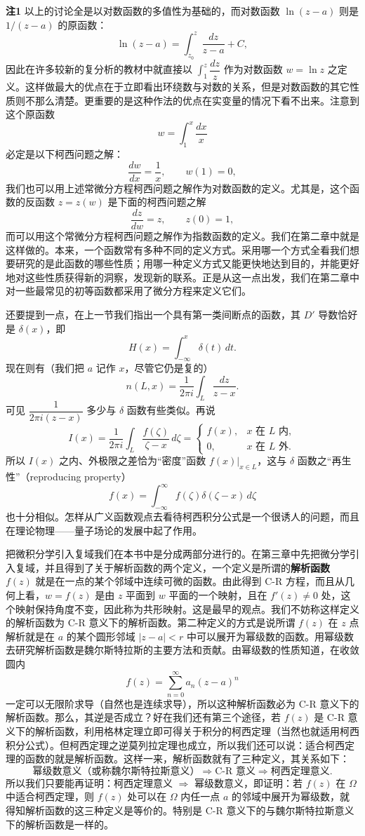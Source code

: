 \noindent\textbf{注1}
以上的讨论全是以对数函数的多值性为基础的，而对数函数 $\ln(z-a)$ 则是 $1/(z-a)$ 的原函数：
\[
 \ln(z-a)=\int_{z_0}^z\frac{dz}{z-a}+C,
\]
因此在许多较新的复分析的教材中就直接以 $\int_1^z\dfrac{dz}{z}$ 作为对数函数 $w=\ln z$ 之定义。这样做最大的优点在于立即看出环绕数与对数的关系，但是对数函数的其它性质则不那么清楚。更重要的是这种作法的优点在实变量的情况下看不出来。注意到这个原函数
\[
 w=\int_1^x\frac{dx}{x}
\]
必定是以下柯西问题之解：
\[
 \frac{dw}{dx}=\frac1x,\qquad w(1)=0,
\]
我们也可以用上述常微分方程柯西问题之解作为对数函数的定义。尤其是，这个函数的反函数 $z=z(w)$ 是下面的柯西问题之解
\[
 \frac{dz}{dw}=z,\qquad z(0)=1,
\]
而可以用这个常微分方程柯西问题之解作为指数函数的定义。我们在第二章中就是这样做的。本来，一个函数常有多种不同的定义方式。采用哪一个方式全看我们想要研究的是此函数的哪些性质；用哪一种定义方式又能更快地达到目的，并能更好地对这些性质获得新的洞察，发现新的联系。正是从这一点出发，我们在第二章中对一些最常见的初等函数都采用了微分方程来定义它们。

还要提到一点，在上一节我们指出一个具有第一类间断点的函数，其 $D'$ 导数恰好是 $\delta(x)$，即
\[
 H(x)=\int_{-\infty}^x\delta(t)\,dt.
\]
现在则有（我们把 $a$ 记作 $x$，尽管它仍是复的）
\[
 n(L,x)=\frac1{2\pi i}\int_L\frac{dz}{z-x}.
\]
可见 $\dfrac1{2\pi i(z-x)}$ 多少与 $\delta$ 函数有些类似。再说
\[
 I(x)=\frac1{2\pi i}\int_L\frac{f(\zeta)}{\zeta-x}\,d\zeta
 =\begin{cases}
 f(x),&x\text{ 在 }L\text{ 内},\\
 0,&x\text{ 在 }L\text{ 外}.
 \end{cases}
\]
所以 $I(x)$ 之内、外极限之差恰为“密度”函数 $f(x)|_{x\in L}$，这与 $\delta$ 函数之“再生性”（reproducing property）
\[
 f(x)=\int_{-\infty}^{\infty}f(\zeta)\delta(\zeta-x)\,d\zeta
\]
也十分相似。怎样从广义函数观点去看待柯西积分公式是一个很诱人的问题，而且在理论物理——量子场论的发展中起了作用。

把微积分学引入复域我们在本书中是分成两部分进行的。在第三章中先把微分学引入复域，并且得到了关于解析函数的两个定义，一个定义是所谓的\textbf{解析函数 $f(z)$} 就是在一点的某个邻域中连续可微的函数。由此得到 C-R 方程，而且从几何上看，$w=f(z)$ 是由 $z$ 平面到 $w$ 平面的一个映射，且在 $f'(z)\ne0$ 处，这个映射保持角度不变，因此称为共形映射。这是最早的观点。我们不妨称这样定义的解析函数为 C-R 意义下的解析函数。第二种定义的方式是说所谓 $f(z)$ 在 $z$ 点解析就是在 $a$ 的某个圆形邻域 $|z-a|<r$ 中可以展开为幂级数的函数。用幂级数去研究解析函数是魏尔斯特拉斯的主要方法和贡献。由幂级数的性质知道，在收敛圆内
\[
 f(z)=\sum_{n=0}^{\infty}a_n(z-a)^n
\]
一定可以无限阶求导（自然也是连续求导），所以这种解析函数必为 C-R 意义下的解析函数。那么，其逆是否成立？好在我们还有第三个途径，若 $f(z)$ 是 C-R 意义下的解析函数，利用格林定理立即可得关于积分的柯西定理（当然也就适用柯西积分公式）。但柯西定理之逆莫列拉定理也成立，所以我们还可以说：适合柯西定理的函数的就是解析函数。这样一来，解析函数就有了三种定义，其关系如下：
\[
 \text{幂级数意义（或称魏尔斯特拉斯意义）}
 \Longrightarrow \text{C-R 意义}
 \Longrightarrow \text{柯西定理意义}.
\]
所以我们只要能再证明：柯西定理意义 $\Rightarrow$ 幂级数意义，即证明：若 $f(z)$ 在 $\Omega$ 中适合柯西定理，则 $f(z)$ 处可以在 $\Omega$ 内任一点 $a$ 的邻域中展开为幂级数，就得知解析函数的这三种定义是等价的。特别是 C-R 意义下的与魏尔斯特拉斯意义下的解析函数是一样的。

